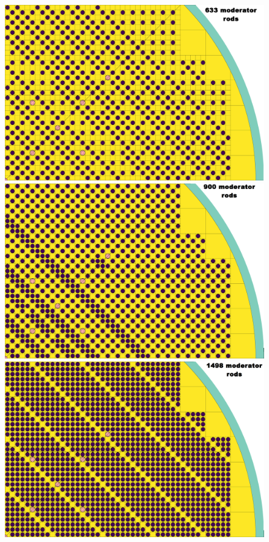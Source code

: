 \begin{frame}
\begin{textblock*}{12.6cm}
\begin{figure}[htp!]
\begin{overprint}
		\centerline{\includegraphics[height=0.75\textheight]{./images/633.png}}
		\centerline{\includegraphics[height=0.75\textheight]{./images/900.png}}
		\centerline{\includegraphics[height=0.75\textheight]{./images/1498.png}}

\end{overprint}
\end{figure}
\end{textblock*}
\end{frame}
